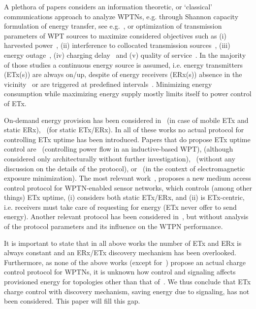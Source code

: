 \documentclass[11pt,draftclsnofoot,journal,onecolumn]{IEEEtran}
\begin{document}
A plethora of papers considers an information theoretic, or `classical' communications approach to analyze WPTNs, e.g. through Shannon capacity formulation of energy transfer, see e.g.~\cite{ju_twc_2014}, or optimization of transmission parameters of WPT sources to maximize considered objectives such as (i) harvested power~\cite{krikidis_tcom_2013,yang_arxiv_2013}, (ii) interference to collocated transmission sources~\cite{timotheou_twc_2014}, (iii) energy outage~\cite{huang_arxiv_2012,ng_globecom_2014}, (iv) charging delay~\cite{fu_infocom_2013} and (v) quality of service~\cite{liu_net_2014}. In the majority of those studies a continuous energy source is assumed, i.e. energy transmitters (ETx(s)) are always on/up, despite of energy receivers (ERx(s)) absence in the vicinity~\cite{timotheou_twc_2014,liu_net_2014} or are triggered at predefined intervals~\cite[Sec III-A]{mercier_jssc_2011}. Minimizing energy consumption while maximizing energy supply mostly limits itself to power control of ETx.

On-demand energy provision has been considered in~\cite{wang_tmc_2014} (in case of mobile ETx and static ERx),~\cite{wicaksono_vtc_2011,naderi_twc_2014} (for static ETx/ERx). In all of these works no actual protocol for controlling ETx uptime has been introduced. Papers that do propose ETx uptime control are~\cite{xiang_pimrc_2013} (controlling power flow in an inductive-based WPT), \cite{yoon_ccnc_2013} (although considered only architecturally without further investigation),~\cite[Fig. 4]{wicaksono_vtc_2011} (without any discussion on the details of the protocol), or~\cite{dai_infocom_2014} (in the context of electromagnetic exposure minimization). The most relevant work~\cite{naderi_twc_2014}, proposes a new medium access control protocol for WPTN-enabled sensor networks, which controls (among other things) ETx uptime, (i) considers both static ETx/ERx, and (ii) is ETx-centric, i.e. receivers must take care of requesting for energy (ETx never offer to send energy). Another relevant protocol has been considered in~\cite[Fig. 4]{wicaksono_vtc_2011}, but without analysis of the protocol parameters and its influence on the WTPN performance.

It is important to state that in all above works the number of ETx and ERx is always constant and an ERx/ETx discovery mechanism has been overlooked. Furthermore, as none of the above works (except for~\cite{naderi_twc_2014}) propose an actual charge control protocol for WPTNs, it is unknown how control and signaling affects provisioned energy for topologies other than that of~\cite{naderi_twc_2014}. We thus conclude that ETx charge control with discovery mechanism, saving energy due to signaling, has not been considered. This paper will fill this gap.
\end{document}
